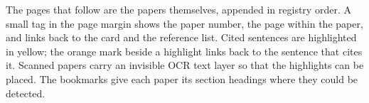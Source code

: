 \noindent The pages that follow are the papers themselves, appended in registry order. A small tag in the page margin shows the paper number, the page within the paper, and links back to the card and the reference list. Cited sentences are highlighted in yellow; the orange mark beside a highlight links back to the sentence that cites it. Scanned papers carry an invisible OCR text layer so that the highlights can be placed. The bookmarks give each paper its section headings where they could be detected.
